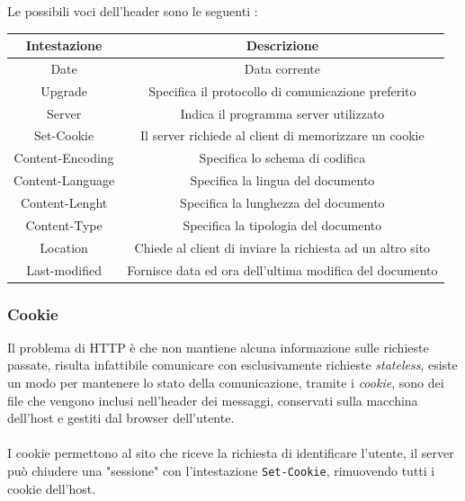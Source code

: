 \documentclass[12pt, letterpaper]{article}
\newcommand{\code}[1]{\colorbox{light-gray}{\texttt{#1}}}
\newcommand{\acc}{\\\hphantom{}\\}
\begin{document}
Le possibili voci dell'header sono le seguenti :\begin{center}
    \begin{tabular}{|c|c|}
        \hline
        \rowcolor[HTML]{C0C0C0}
        \textbf{Intestazione} & \textbf{Descrizione}                                      \\ \hline
        \rowcolor[HTML]{FFFFFF}
        Date                  & \cellcolor[HTML]{FFFFFF}Data corrente                     \\ \hline
        \rowcolor[HTML]{FFFFFF}
        Upgrade               & Specifica il protocollo di comunicazione preferito        \\ \hline
        \rowcolor[HTML]{FFFFFF}
        Server                & Indica il programma server utilizzato                     \\ \hline
        Set-Cookie            & Il server richiede al client di memorizzare un cookie     \\ \hline
        Content-Encoding      & Specifica lo schema di codifica                           \\ \hline
        Content-Language      & Specifica la lingua del documento                         \\ \hline
        \rowcolor[HTML]{FFFFFF}
        Content-Lenght        & Specifica la lunghezza del documento                      \\ \hline
        \rowcolor[HTML]{FFFFFF}
        Content-Type          & Specifica la tipologia del documento                      \\ \hline
        \rowcolor[HTML]{FFFFFF}
        Location              & Chiede al client di inviare la richiesta ad un altro sito \\ \hline
        Last-modified         & Fornisce data ed ora dell'ultima modifica del documento   \\ \hline
    \end{tabular}
\end{center}
\subsubsection{Cookie}
Il problema di HTTP è che non mantiene alcuna informazione sulle richieste passate, risulta infattibile
comunicare con esclusivamente richieste \textit{stateless}, esiste un modo per mantenere lo stato
della comunicazione, tramite i \textit{cookie}, sono dei file che vengono inclusi nell'header dei messaggi,
conservati sulla macchina dell'host e gestiti dal browser dell'utente.\acc I cookie permettono al sito che riceve
la richiesta di identificare l'utente, il server può chiudere una "sessione" con l'intestazione
\code{Set-Cookie}, rimuovendo tutti i cookie dell'host.
\end{document}
